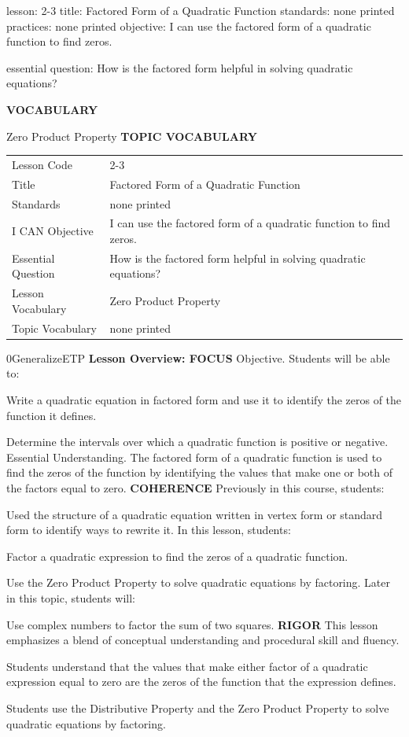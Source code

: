 \documentclass{article}
\newenvironment{lesson-meta}{}{}        %
\newenvironment{te-addendum}[2]{}{}     %
\newcommand{\te}[1]{}                   %
\begin{document}
\begin{lesson-meta}
lesson: 2-3
title: Factored Form of a Quadratic Function
standards: none printed
practices: none printed
objective: I can use the factored form of a quadratic function to find zeros.

essential question: How is the factored form helpful in solving quadratic equations?

\textbf{VOCABULARY}
\item Zero Product Property
\textbf{TOPIC VOCABULARY}
\te{No topic vocabulary list is printed on these lesson pages.}
\begin{tabular}{ll}
Lesson Code & 2-3 \\
Title & Factored Form of a Quadratic Function \\
Standards & none printed \\
I CAN Objective & I can use the factored form of a quadratic function to find zeros. \\
Essential Question & How is the factored form helpful in solving quadratic equations? \\
Lesson Vocabulary & Zero Product Property \\
Topic Vocabulary & none printed \\
\end{tabular}
\end{lesson-meta}
\begin{te-addendum}{0}{GeneralizeETP}
\textbf{Lesson Overview: FOCUS}
Objective. Students will be able to:
\item Write a quadratic equation in factored form and use it to identify the zeros of the function it defines.
\item Determine the intervals over which a quadratic function is positive or negative.
Essential Understanding. The factored form of a quadratic function is used to find the zeros of the function by identifying the values that make one or both of the factors equal to zero.
\textbf{COHERENCE}
Previously in this course, students:
\item Used the structure of a quadratic equation written in vertex form or standard form to identify ways to rewrite it.
In this lesson, students:
\item Factor a quadratic expression to find the zeros of a quadratic function.
\item Use the Zero Product Property to solve quadratic equations by factoring.
Later in this topic, students will:
\item Use complex numbers to factor the sum of two squares.
\textbf{RIGOR}
This lesson emphasizes a blend of conceptual understanding and procedural skill and fluency.
\item Students understand that the values that make either factor of a quadratic expression equal to zero are the zeros of the function that the expression defines.
\item Students use the Distributive Property and the Zero Product Property to solve quadratic equations by factoring.
\end{te-addendum}
\end{document}
